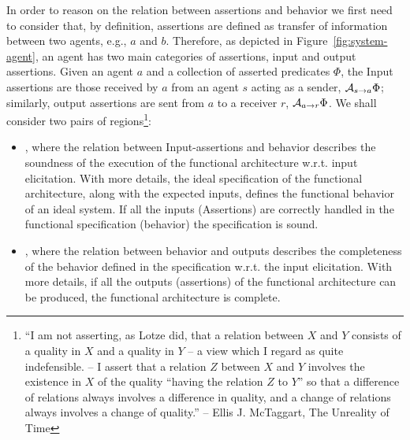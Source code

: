 In order to reason on the relation between assertions and behavior we first
need to consider that, by definition, assertions are defined as transfer of
information between two agents, e.g., $a$ and $b$.  Therefore, as depicted in
Figure~\ref{fig:system-agent}, an agent has two main categories of assertions,
input and output assertions.  Given an agent $a$ and a collection of asserted
predicates $\Phi$, the Input assertions are those received by $a$ from an agent
$s$ acting as a sender, $\mathcal{A}_{s\rightarrow a}\Phi$; similarly, output assertions
are sent from $a$ to a receiver $r$, $\mathcal{A}_{a\rightarrow r}\Phi$. We shall consider
two pairs of regions\footnote{``I am not asserting, as Lotze did, that a relation between $X$ and $Y$
consists of a quality in $X$ and a quality in $Y$ -- a view which I regard as
quite indefensible. -- I assert that a relation $Z$ between $X$ and $Y$ involves
the existence in $X$ of the quality ``having the relation $Z$ to $Y$'' so that
a difference of relations always involves a difference in quality, and a
change of relations always involves a change of quality.'' --  Ellis J. McTaggart, The Unreality of Time\autocite{Mctaggart1908unreality}}: 
\begin{itemize}
	\item {},
		where the relation between Input-assertions and behavior
		describes the soundness of the execution of the functional
		architecture w.r.t. input elicitation. With more details, the
		ideal specification of the functional architecture, along with
		the expected inputs, defines the functional behavior of an
		ideal system.  If all the inputs (Assertions) are correctly
		handled in the functional specification (behavior) the
		specification is sound. 

	\item {},
		where the relation between behavior and outputs describes the
		completeness of the behavior defined in the specification
		w.r.t. the input elicitation.  With more details, if all the
		outputs (assertions) of the functional architecture can be
		produced, the functional architecture is complete.
\end{itemize}


